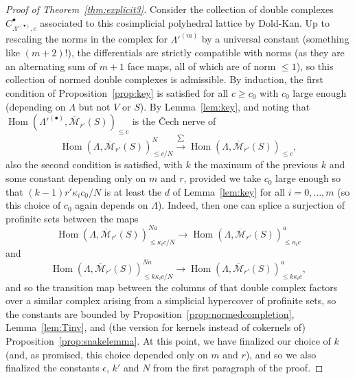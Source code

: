 \documentclass[11pt]{amsbook}
\DeclareMathOperator{\Hom}{Hom}
\numberwithin{equation}{section}
\numberwithin{theorem}{section}
\theoremstyle{definition}
\begin{document}
\begin{proof}[Proof of Theorem~\ref{thm:explicit3}]
Consider the collection of double complexes $C_{\Lambda'^{(\bullet)},c}^\bullet$ associated to this cosimplicial polyhedral lattice by Dold-Kan. Up to rescaling the norms in the complex for $\Lambda'^{(m)}$ by a universal constant (something like $(m+2)!$), the differentials are strictly compatible with norms (as they are an alternating sum of $m+1$ face maps, all of which are of norm $\leq 1$), so this collection of normed double complexes is admissible. By induction, the first condition of Proposition~\ref{prop:key} is satisfied for all $c\geq c_0$ with $c_0$ large enough (depending on $\Lambda$ but not $V$ or $S$). By Lemma~\ref{lem:key}, and noting that $\Hom(\Lambda'^{(\bullet)},\overline{\mathcal M}_{r'}(S))_{\leq c}$ is the \v{C}ech nerve of
\[
\Hom(\Lambda,\overline{\mathcal M}_{r'}(S))_{\leq c/N}^N\xrightarrow{\sum} \Hom(\Lambda,\overline{\mathcal M}_{r'}(S))_{\leq c},
\]
also the second condition is satisfied, with $k$ the maximum of the previous $k$ and some constant depending only on $m$ and $r$, provided we take $c_0$ large enough so that $(k-1)r'\kappa_ic_0/N$ is at least the $d$ of Lemma~\ref{lem:key} for all $i=0,\ldots,m$ (so this choice of $c_0$ again depends on $\Lambda$). Indeed, then one can splice a surjection of profinite sets between the maps
\[
\Hom(\Lambda,\overline{\mathcal M}_{r'}(S))_{\leq \kappa_ic/N}^{Na}\to\Hom(\Lambda,\overline{\mathcal M}_{r'}(S))_{\leq \kappa_ic}^a
\]
and
\[
\Hom(\Lambda,\overline{\mathcal M}_{r'}(S))_{\leq k\kappa_ic/N}^{Na}\to \Hom(\Lambda,\overline{\mathcal M}_{r'}(S))_{\leq k\kappa_ic}^a,
\]
and so the transition map between the columns of that double complex factors over a similar complex arising from a simplicial hypercover of profinite sets, so the constants are bounded by Proposition~\ref{prop:normedcompletion}, Lemma~\ref{lem:Tinv}, and (the version for kernels instead of cokernels of) Proposition~\ref{prop:snakelemma}. At this point, we have finalized our choice of $k$ (and, as promised, this choice depended only on $m$ and $r$), and so we also finalized the constants $\epsilon$, $k'$ and $N$ from the first paragraph of the proof.


\end{proof}
\end{document}
